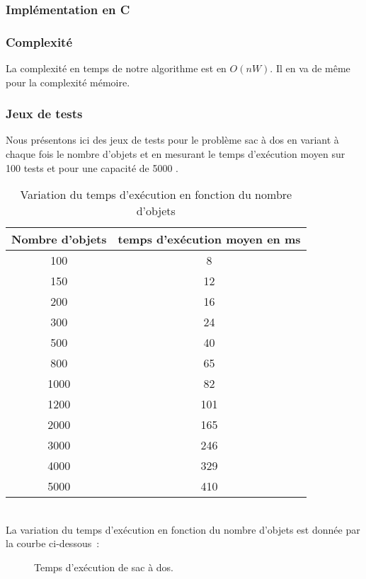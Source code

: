 \subsubsection{Implémentation en C}

 


\subsubsection{Complexité}

La complexité en temps de notre algorithme est en $O(nW)$. Il en va de
même pour la complexité mémoire.

\subsubsection{Jeux de tests}

Nous présentons ici des jeux de tests pour le problème sac à dos en variant à chaque fois le nombre d'objets et en mesurant le temps d'exécution moyen sur 100 tests et pour une capacité de 5000 .
\begin{table}[h!]
\centering
\begin{tabular}{|c|c|}
\hline
Nombre d'objets & temps d'exécution moyen en ms\\
\hline
100 & 8\\
\hline
150 & 12\\
\hline
200 & 16\\
\hline
300 & 24\\
\hline
500 & 40\\
\hline
800 & 65\\
\hline
1000 & 82\\
\hline
1200 & 101\\
\hline
2000 & 165\\
\hline
3000 & 246\\
\hline
 4000 & 329\\
\hline
  5000 & 410\\
\hline
\end{tabular}
\caption {Variation du temps d'exécution en fonction du nombre d'objets}
\end{table}\\
La variation du temps d'exécution en fonction du nombre d'objets est donnée par la courbe ci-dessous~:
\begin{figure}[h!]
\centering
{}
\caption{Temps d'exécution de sac à dos.}
\end{figure}

